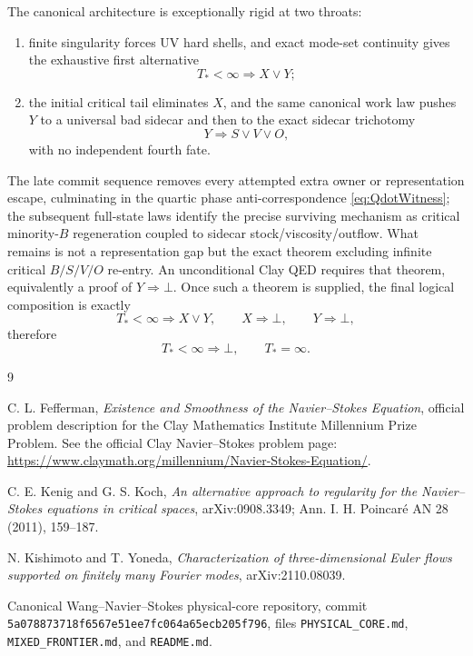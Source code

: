 \documentclass[11pt]{article}
\begin{document}
The canonical architecture is exceptionally rigid at two throats:
\begin{enumerate}[label=\arabic*.]
\item finite singularity forces UV hard shells, and exact mode-set continuity gives the exhaustive first alternative
\[
T_*<\infty\Longrightarrow X\vee Y;
\]
\item the initial critical tail eliminates $X$, and the same canonical work law pushes $Y$ to a universal bad sidecar and then to the exact sidecar trichotomy
\[
Y\Longrightarrow S\vee V\vee O,
\]
with no independent fourth fate.
\end{enumerate}
The late commit sequence removes every attempted extra owner or representation escape, culminating in the quartic phase anti-correspondence \eqref{eq:QdotWitness}; the subsequent full-state laws identify the precise surviving mechanism as critical minority-$B$ regeneration coupled to sidecar stock/viscosity/outflow.  What remains is not a representation gap but the exact theorem excluding infinite critical $B/S/V/O$ re-entry.  An unconditional Clay QED requires that theorem, equivalently a proof of $Y\Rightarrow\bot$.  Once such a theorem is supplied, the final logical composition is exactly
\[
T_*<\infty\Rightarrow X\vee Y,
\qquad
X\Rightarrow\bot,
\qquad
Y\Rightarrow\bot,
\]
therefore
\[
T_*<\infty\Rightarrow\bot,
\qquad
\boxed{T_*=\infty}.
\]

\begin{thebibliography}{9}

C. L. Fefferman,
\emph{Existence and Smoothness of the Navier--Stokes Equation},
official problem description for the Clay Mathematics Institute Millennium Prize Problem.
See the official Clay Navier--Stokes problem page:
\url{https://www.claymath.org/millennium/Navier-Stokes-Equation/}.

C. E. Kenig and G. S. Koch,
\emph{An alternative approach to regularity for the Navier--Stokes equations in critical spaces},
arXiv:0908.3349; Ann. I. H. Poincar\'e AN 28 (2011), 159--187.

N. Kishimoto and T. Yoneda,
\emph{Characterization of three-dimensional Euler flows supported on finitely many Fourier modes},
arXiv:2110.08039.

Canonical Wang--Navier--Stokes physical-core repository,
commit \texttt{5a078873718f6567e51ee7fc064a65ecb205f796},
files \texttt{PHYSICAL\_CORE.md}, \texttt{MIXED\_FRONTIER.md}, and \texttt{README.md}.

\end{thebibliography}
\end{document}
